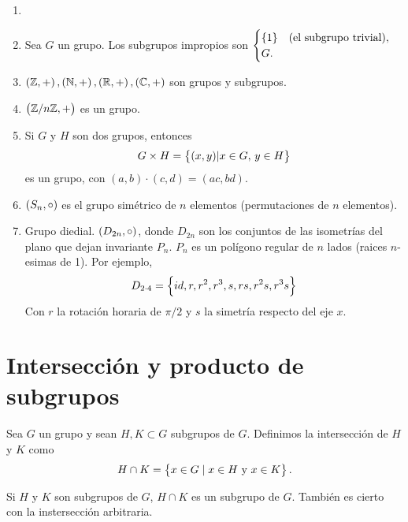 \begin{example}
    \begin{enumerate}[1.]
        \item[]
        \item Sea $G$ un grupo. Los subgrupos impropios son
                $\begin{cases}
                    \left\{1\right\} &\text{(el subgrupo trivial)}, \\
                    G. &
                \end{cases}$
        \item $\left( \mathbb{Z}, + \right), \left( \mathbb{N}, + \right), \left( \mathbb{R}, + \right), \left( \mathbb{C}, + \right)$ son grupos y subgrupos.
        \item $\left( \mathbb{Z}/n\mathbb{Z}, + \right)$ es un grupo.
        \item Si $G$ y $H$ son dos grupos, entonces
            \[
                 G \times H = \left\{(x,y) \vert x \in G, \, y \in H\right\}   
            \]
            es un grupo, con $(a, b) \cdot (c, d) = (ac, bd)$.
        \item $\left( S_n, \circ \right)$ es el grupo simétrico de $n$ elementos (permutaciones de $n$ elementos).
        \item Grupo diedial. $\left( D_{2n}, \circ \right)$, donde $D_{2n}$ son los conjuntos de las isometrías del plano que dejan invariante $P_n$.
            $P_n$ es un polígono regular de $n$ lados (raices $n$-esimas de 1). Por ejemplo,
            \[
                D_{2 \cdot 4} = \left\{id, r, r^2, r^3, s, rs, r^2s, r^3s\right\}
            \]
            Con $r$ la rotación horaria de $\pi / 2$ y $s$ la simetría respecto del eje $x$.
    \end{enumerate}
\end{example}

\section{Intersección y producto de subgrupos}

\begin{defi}
    Sea $G$ un grupo y sean $H, K \subset G$ subgrupos de $G$. Definimos la intersección de
    $H$ y $K$ como
    \[
        H \cap K = \left\{x \in G \; \vert \; x \in H \text{ y } x \in K\right\}.
    \]
\end{defi}

\begin{obs}
    Si $H$ y $K$ son subgrupos de $G$, $H \cap K$ es un subgrupo de $G$.
    También es cierto con la instersección arbitraria.
\end{obs}

